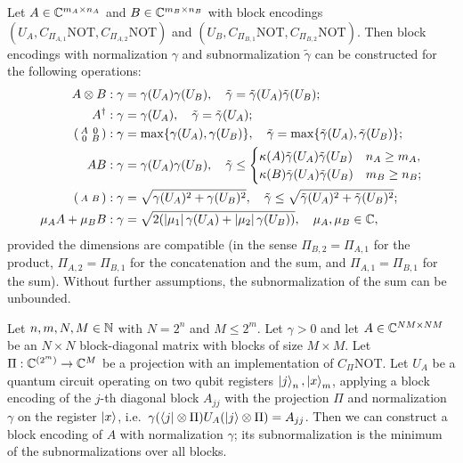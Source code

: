 \begin{proposition}
Let $A \in \mathbb{C}^{m_A \times n_A}$ and $B \in \mathbb{C}^{m_B \times n_B}$ with block
encodings $(U_A, C_{\Pi_{A,1}}\mathrm{NOT}, C_{\Pi_{A,2}}\mathrm{NOT})$ and
$(U_B, C_{\Pi_{B,1}}\mathrm{NOT}, C_{\Pi_{B,2}}\mathrm{NOT})$. Then block encodings
with normalization $\gamma$ and subnormalization $\tilde{\gamma}$ can be
constructed for the following operations:
\begin{align}
  A \otimes B &: \gamma = \gamma(U_A)\gamma(U_B),\quad \tilde{\gamma} = \tilde{\gamma}(U_A)\tilde{\gamma}(U_B); \\
  A^{\dagger} &: \gamma = \gamma(U_A),\quad \tilde{\gamma} = \tilde{\gamma}(U_A); \\
  \begin{psmallmatrix} A & 0 \\ 0 & B \end{psmallmatrix} &: \gamma = \max\{\gamma(U_A), \gamma(U_B)\},\quad \tilde{\gamma} = \max\{\tilde{\gamma}(U_A), \tilde{\gamma}(U_B)\}; \\
  AB &: \gamma = \gamma(U_A)\gamma(U_B),\quad \tilde{\gamma} \le \begin{cases} \kappa(A)\tilde{\gamma}(U_A)\tilde{\gamma}(U_B) & n_A \ge m_A, \\ \kappa(B)\tilde{\gamma}(U_A)\tilde{\gamma}(U_B) & m_B \ge n_B; \end{cases} \\
  \begin{psmallmatrix} A & B \end{psmallmatrix} &: \gamma = \sqrt{\gamma(U_A)^2 + \gamma(U_B)^2},\quad \tilde{\gamma} \le \sqrt{\tilde{\gamma}(U_A)^2 + \tilde{\gamma}(U_B)^2}; \\
  \mu_A A + \mu_B B &: \gamma = \sqrt{2(\left\lvert \mu_1 \right\rvert\gamma(U_A) + \left\lvert \mu_2 \right\rvert\gamma(U_B))}, \quad \mu_A, \mu_B \in \mathbb{C},
\end{align}
provided the dimensions are compatible (in the sense $\Pi_{B,2} = \Pi_{A,1}$ for
the product, $\Pi_{A,2} = \Pi_{B,1}$ for the concatenation and the sum, and
$\Pi_{A,1} = \Pi_{B,1}$ for the sum). Without further assumptions, the
subnormalization of the sum can be unbounded.
\end{proposition}

\begin{proposition}
Let $n, m, N, M \in \mathbb{N}$ with $N = 2^n$ and $M \le 2^m$. Let $\gamma > 0$ and let
$A \in \mathbb{C}^{NM \times NM}$ be an $N \times N$ block-diagonal matrix with blocks of
size $M \times M$. Let $\Pi : \mathbb{C}^{(2^m)} \to \mathbb{C}^M$ be a projection with an
implementation of $C_\Pi\mathrm{NOT}$. Let $U_A$ be a quantum circuit operating on
two qubit registers $\ket{j}_n, \ket{x}_m$, applying a block encoding of the
$j$-th diagonal block $A_{jj}$ with the projection $\Pi$ and normalization
$\gamma$ on the register $\ket{x}$, i.e.\
$\gamma(\bra{j} \otimes \Pi) U_A (\ket{j} \otimes \Pi) = A_{jj}$. Then we can
construct a block encoding of $A$ with normalization $\gamma$; its
subnormalization is the minimum of the subnormalizations over all blocks.
\end{proposition}

